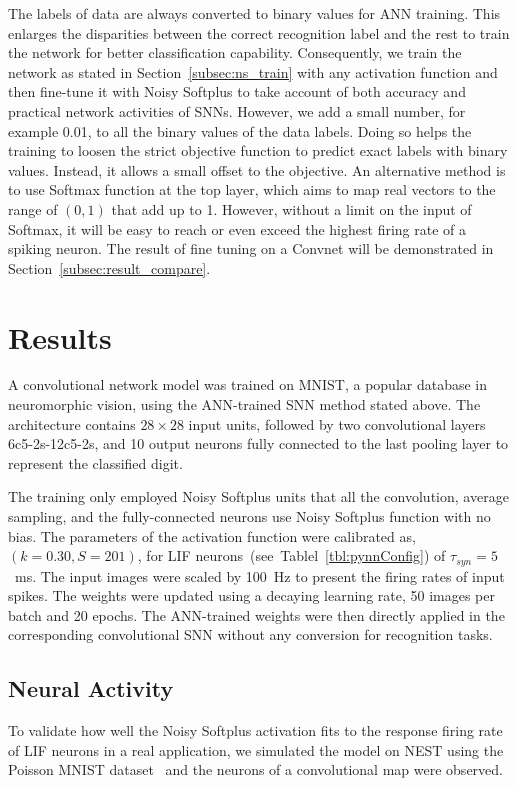 \documentclass[runningheads,a4paper]{llncs}
\begin{document}
The labels of data are always converted to binary values for ANN training.
This enlarges the disparities between the correct recognition label and the rest to train the network for better classification capability.
Consequently, we train the network as stated in Section~\ref{subsec:ns_train} with any activation function and then fine-tune it with Noisy Softplus to take account of both accuracy and practical network activities of SNNs.
However, we add a small number, for example 0.01, to all the binary values of the data labels.
Doing so helps the training to loosen the strict objective function to predict exact labels with binary values.
Instead, it allows a small offset to the objective.
An alternative method is to use Softmax function at the top layer, which aims to map real vectors to the range of $(0,1)$ that add up to 1. 
However, without a limit on the input of Softmax, it will be easy to reach or even exceed the highest firing rate of a spiking neuron.
The result of fine tuning on a Convnet will be demonstrated in Section~\ref{subsec:result_compare}.


\section{Results}
\label{sec:iconipResult}
A convolutional network model was trained on MNIST,
a popular database in neuromorphic vision, using the ANN-trained SNN method stated above.
The architecture contains $28\times28$ input units, followed by two convolutional layers 6c5-2s-12c5-2s, and 10 output neurons fully connected to the last pooling layer to represent the classified digit.

The training only employed Noisy Softplus units that all the convolution, average sampling, and the fully-connected neurons use Noisy Softplus function with no bias.
The parameters of the activation function were calibrated as, $(k=0.30, S=201)$,  for LIF neurons~(see~Tablel~\ref{tbl:pynnConfig}) of $\tau_{syn}=5$~ms.
The input images were scaled by 100~Hz to present the firing rates of input spikes.
The weights were updated using a decaying learning rate, 50 images per batch and 20 epochs.
The ANN-trained weights were then directly applied in the corresponding convolutional SNN without any conversion for recognition tasks.


\subsection{Neural Activity}
To validate how well the Noisy Softplus activation fits to the response firing rate of LIF neurons in a real application, we simulated the model on NEST using the Poisson MNIST dataset~\cite{liu2016bench} and the neurons of a convolutional map were observed.
\end{document}

